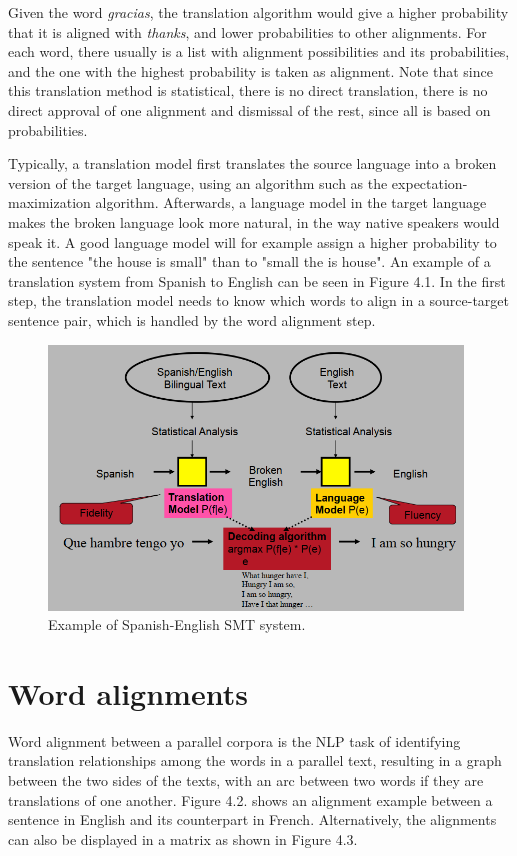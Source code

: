 Given the word \emph{gracias}, the translation algorithm would give a higher probability that it is aligned with \emph{thanks}, and lower probabilities to other alignments. For each word, there usually is a list with alignment possibilities and its probabilities, and the one with the highest probability is taken as alignment. Note that since this translation method is statistical, there is no direct translation, there is no direct approval of one alignment and dismissal of the rest, since all is based on probabilities.

Typically, a translation model first translates the source language into a broken version of the target language, using an algorithm such as the expectation-maximization algorithm. Afterwards, a language model in the target language makes the broken language look more natural, in the way native speakers would speak it. A good language model will for example assign a higher probability to the sentence "the house is small" than to "small the is house". An example of a translation system from Spanish to English can be seen in Figure  4.1. In the first step, the translation model needs to know which words to align in a source-target sentence pair, which is handled by the word alignment step.

\begin{figure}[!ht]
    \centering
    \includegraphics[width=11cm]{figures/smt.png}
    \caption{Example of Spanish-English SMT system.}
\end{figure}

\section{Word alignments}

Word alignment between a parallel corpora is the NLP task of identifying translation relationships among the words in a parallel text, resulting in a graph between the two sides of the texts, with an arc between two words if they are translations of one another. Figure 4.2. shows an alignment example between a sentence in English and its counterpart in French. Alternatively, the alignments can also be displayed in a matrix as shown in Figure 4.3.

